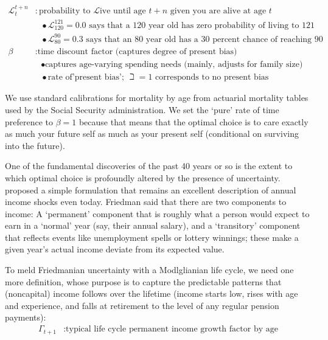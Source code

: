 \documentclass{article}
\newcommand{\DiscFac}{\beta}
\newcommand{\Alive}{\mathcal{L}}
\newcommand{\permGroFac}{\Gamma}
\begin{document}
\begin{align}
    \\ \Alive _{t}^{t+n} & : \text{probability to }\Alive\text{ive until age $t+n$ given you are alive at age $t$}
    \\                   & {~~~}\bullet \text{$\Alive_{120}^{121} = 0.0$ says that a 120 year old has zero probability of living to 121}
    \\                   & {~~~}\bullet \text{$\Alive_{80}^{90} = 0.3$ says that an 80 year old has a 30 percent chance of reaching 90}
    \\ {\DiscFac}        & : \text{time discount factor (captures degree of present bias)}
    \\                   & {~~~} \bullet \text{captures age-varying spending needs (mainly, adjusts for family size)}
    \\                   & {~~~} \bullet \text{rate of'present bias'; $\beth=1$ corresponds to no present bias}
\end{align}

We use standard calibrations for mortality by age from actuarial mortality tables used by the Social Security administration. We set the `pure' rate of time preference to $\beta=1$ because that means that the optimal choice is to care exactly as much your future self as much as your present self (conditional on surviving into the future).

One of the fundamental discoveries of the past 40 years or so is the extent to which optimal choice is profoundly altered by the presence of uncertainty. \cite{friedman1957} proposed a simple formulation that remains an excellent description of annual income shocks even today. Friedman said that there are two components to income: A `permanent' component that is roughly what a person would expect to earn in a `normal' year (say, their annual salary), and a `transitory' component that reflects events like unemployment spells or lottery winnings; these make a given year's actual income deviate from its expected value.

To meld Friedmanian uncertainty with a Modlglianian life cycle, we need one more definition, whose purpose is to capture the predictable patterns that (noncapital) income follows over the lifetime (income starts low, rises with age and experience, and falls at retirement to the level of any regular pension payments):
\begin{align}
    \permGroFac_{t+1} & : \text{typical life cycle permanent income growth factor by age}
\end{align}
\end{document}
